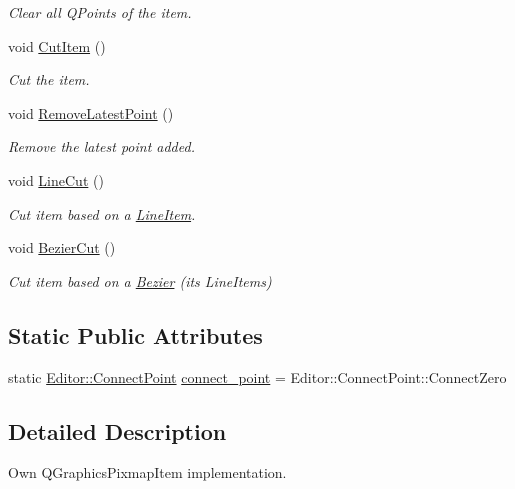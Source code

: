 \begin{DoxyCompactItemize}
\begin{DoxyCompactList}\small\item\em Clear all Q\+Points of the item. \end{DoxyCompactList}\item 
void \mbox{\hyperlink{classPixmapItem_a4a742318dce01d018da2f4b01790c210}{Cut\+Item}} ()
\begin{DoxyCompactList}\small\item\em Cut the item. \end{DoxyCompactList}\item 
void \mbox{\hyperlink{classPixmapItem_ae2e67a7b69ef10dc613e14c1d3c1a327}{Remove\+Latest\+Point}} ()
\begin{DoxyCompactList}\small\item\em Remove the latest point added. \end{DoxyCompactList}\item 
void \mbox{\hyperlink{classPixmapItem_ab71710e3b66024a62fe56a43e60141b3}{Line\+Cut}} ()
\begin{DoxyCompactList}\small\item\em Cut item based on a \mbox{\hyperlink{classLineItem}{Line\+Item}}. \end{DoxyCompactList}\item 
void \mbox{\hyperlink{classPixmapItem_a660c7d73c4f915e6673a3b602affb568}{Bezier\+Cut}} ()
\begin{DoxyCompactList}\small\item\em Cut item based on a \mbox{\hyperlink{classBezier}{Bezier}} (its Line\+Items) \end{DoxyCompactList}\end{DoxyCompactItemize}
\subsection*{Static Public Attributes}
\begin{DoxyCompactItemize}
\item 
static \mbox{\hyperlink{namespaceEditor_aad9ecf07f59416285836e79f1b1d2bd8}{Editor\+::\+Connect\+Point}} \mbox{\hyperlink{classPixmapItem_a3733ea98fc45c24acc1bc1552e969895}{connect\+\_\+point}} = Editor\+::\+Connect\+Point\+::\+Connect\+Zero
\end{DoxyCompactItemize}


\subsection{Detailed Description}
Own Q\+Graphics\+Pixmap\+Item implementation. 

